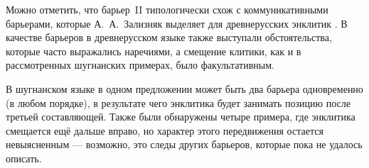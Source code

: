 Можно отметить, что барьер~II типологически схож с коммуникативными барьерами, которые А.~А.~Зализняк выделяет для древнерусских энклитик \parencite[98]{zalizniak2008}. В качестве барьеров в древнерусском языке также выступали обстоятельства, которые часто выражались наречиями, а смещение клитики, как и в рассмотренных шугнанских примерах, было факультативным.

В шугнанском языке в одном предложении может быть два барьера одновременно (в любом порядке), в результате чего энклитика будет занимать позицию после третьей составляющей. Также были обнаружены четыре примера, где энклитика смещается ещё дальше вправо, но характер этого передвижения остается невыясненным — возможно, это следы других барьеров, которые пока не удалось описать.
